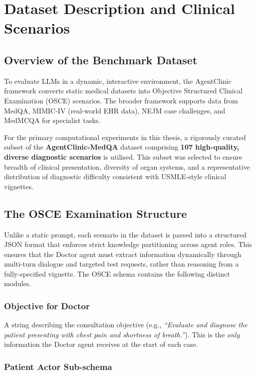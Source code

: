 \chapter{Dataset Description and Clinical Scenarios}
\label{Chapter3}

\section{Overview of the Benchmark Dataset}

To evaluate LLMs in a dynamic, interactive environment, the AgentClinic framework converts static medical datasets into Objective Structured Clinical Examination (OSCE) scenarios. The broader framework supports data from MedQA, MIMIC-IV (real-world EHR data), NEJM case challenges, and MedMCQA for specialist tasks.

For the primary computational experiments in this thesis, a rigorously curated subset of the \textbf{AgentClinic-MedQA} dataset comprising \textbf{107 high-quality, diverse diagnostic scenarios} is utilised. This subset was selected to ensure breadth of clinical presentation, diversity of organ systems, and a representative distribution of diagnostic difficulty consistent with USMLE-style clinical vignettes.

\section{The OSCE Examination Structure}

Unlike a static prompt, each scenario in the dataset is parsed into a structured JSON format that enforces strict knowledge partitioning across agent roles. This ensures that the Doctor agent must extract information dynamically through multi-turn dialogue and targeted test requests, rather than reasoning from a fully-specified vignette. The OSCE schema contains the following distinct modules.

\subsection{Objective for Doctor}

A string describing the consultation objective (e.g., \textit{``Evaluate and diagnose the patient presenting with chest pain and shortness of breath.''}). This is the \textit{only} information the Doctor agent receives at the start of each case.

\subsection{Patient Actor Sub-schema}

